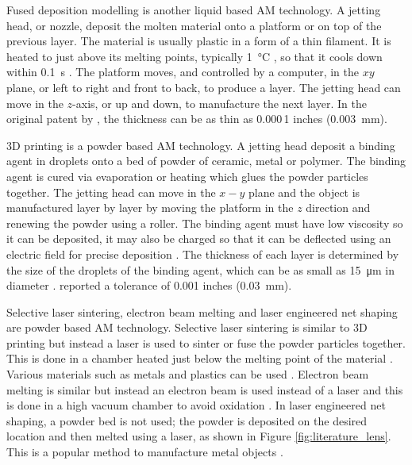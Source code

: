 Fused deposition modelling is another liquid based AM technology. A jetting head, or nozzle, deposit the molten material onto a platform or on top of the previous layer. The material is usually plastic in a form of a thin filament. It is heated to just above its melting points, typically \SI{1}{\degreeCelsius} \citep{crump1992apparatus}, so that it cools down within \SI{0.1}{\second} \citep{kruth1991material}. The platform moves, and controlled by a computer, in the $xy$ plane, or left to right and front to back, to produce a layer. The jetting head can move in the $z$-axis, or up and down, to manufacture the next layer. In the original patent by \cite{crump1992apparatus}, the thickness can be as thin as 0.000\,1 inches (\SI{0.003}{\milli\metre}).

3D printing is a powder based AM technology. A jetting head deposit a binding agent in droplets onto a bed of powder of ceramic, metal or polymer. The binding agent is cured via evaporation or heating which glues the powder particles together. The jetting head can move in the $x-y$ plane and the object is manufactured layer by layer by moving the platform in the $z$ direction and renewing the powder using a roller. The binding agent must have low viscosity so it can be deposited, it may also be charged so that it can be deflected using an electric field for precise deposition \citep{sachs1990three}. The thickness of each layer is determined by the size of the droplets of the binding agent, which can be as small as \SI{15}{\micro\metre} in diameter \citep{sachs1990three}. \cite{sachs1990three} reported a tolerance of 0.001 inches (\SI{0.03}{\milli\metre}).

Selective laser sintering, electron beam melting and laser engineered net shaping are powder based AM technology. Selective laser sintering is similar to 3D printing but instead a laser is used to sinter or fuse the powder particles together. This is done in a chamber heated just below the melting point of the material \citep{wong2012review}. Various materials such as metals and plastics can be used \citep{wong2012review}. Electron beam melting is similar but instead an electron beam is used instead of a laser and this is done in a high vacuum chamber to avoid oxidation \citep{wong2012review}. In laser engineered net shaping, a powder bed is not used; the powder is deposited on the desired location and then melted using a laser, as shown in Figure \ref{fig:literature_lens}. This is a popular method to manufacture metal objects \citep{gibson2010additive}.

